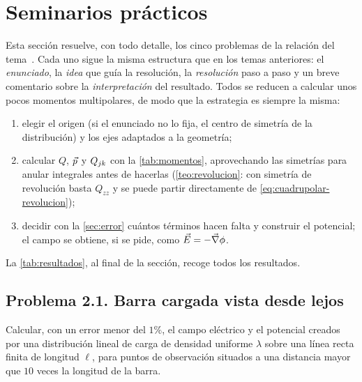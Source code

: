 \section{Seminarios prácticos}\label{sec:seminarios}
Esta sección resuelve, con todo detalle, los cinco problemas de la relación del tema~\cite{PROBLEMAS-T2}. Cada uno sigue la misma estructura que en
los temas anteriores: el \emph{enunciado}, la \emph{idea} que guía la resolución, la \emph{resolución} paso a paso y un breve comentario sobre la
\emph{interpretación} del resultado. Todos se reducen a calcular unos pocos momentos multipolares, de modo que la estrategia es siempre la misma:
\begin{enumerate}[label=(\arabic*)]
  \item elegir el origen (si el enunciado no lo fija, el centro de simetría de la distribución) y los ejes adaptados a la geometría;
  \item calcular $Q$, $\vec{p}$ y $Q_{jk}$ con la \cref{tab:momentos}, aprovechando las simetrías para anular integrales antes de hacerlas
        (\cref{teo:revolucion}: con simetría de revolución basta $Q_{zz}$ y se puede partir directamente de \cref{eq:cuadrupolar-revolucion});
  \item decidir con la \cref{sec:error} cuántos términos hacen falta y construir el potencial; el campo se obtiene, si se pide, como $\vec{E}=-\vec{\nabla}\phi$.
\end{enumerate}
La \cref{tab:resultados}, al final de la sección, recoge todos los resultados.

\subsection{Problema 2.1. Barra cargada vista desde lejos}\label{sem:barra}
\begin{ejercicio}\label{ejer:barra}
Calcular, con un error menor del $1\%$, el campo eléctrico y el potencial creados por una distribución lineal de carga de densidad uniforme $\lambda$ sobre una línea
recta finita de longitud $\ell$, para puntos de observación situados a una distancia mayor que $10$ veces la longitud de la barra.
\end{ejercicio}

